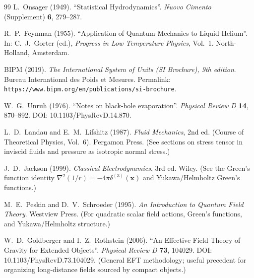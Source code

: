 \documentclass[pdflatex,sn-mathphys-num]{revtex4-2}
\begin{document}
\begin{thebibliography}{99}
        L.~Onsager (1949).
        ``Statistical Hydrodynamics''.
        \textit{Nuovo Cimento} (Supplement) \textbf{6}, 279--287.

        R.~P.~Feynman (1955).
        ``Application of Quantum Mechanics to Liquid Helium''.
        In: C.~J.~Gorter (ed.), \textit{Progress in Low Temperature Physics}, Vol.\ 1.
        North-Holland, Amsterdam.

        BIPM (2019).
        \textit{The International System of Units (SI Brochure), 9th edition}.
        Bureau International des Poids et Mesures.
        Permalink: \texttt{https://www.bipm.org/en/publications/si-brochure}.

        W.~G.~Unruh (1976).
        ``Notes on black-hole evaporation''.
        \textit{Physical Review D} \textbf{14}, 870--892.
        DOI: 10.1103/PhysRevD.14.870.

        L.~D.~Landau and E.~M.~Lifshitz (1987).
        \textit{Fluid Mechanics}, 2nd ed. (Course of Theoretical Physics, Vol.~6).
        Pergamon Press.
        (See sections on stress tensor in inviscid fluids and pressure as isotropic normal stress.)

        J.~D.~Jackson (1999).
        \textit{Classical Electrodynamics}, 3rd ed.
        Wiley.
        (See the Green's function identity \(\nabla^2(1/r)=-4\pi\delta^{(3)}(\mathbf{x})\) and Yukawa/Helmholtz Green's functions.)

        M.~E.~Peskin and D.~V.~Schroeder (1995).
        \textit{An Introduction to Quantum Field Theory}.
        Westview Press.
        (For quadratic scalar field actions, Green's functions, and Yukawa/Helmholtz structure.)

        W.~D.~Goldberger and I.~Z.~Rothstein (2006).
        ``An Effective Field Theory of Gravity for Extended Objects''.
        \textit{Physical Review D} \textbf{73}, 104029.
        DOI: 10.1103/PhysRevD.73.104029.
        (General EFT methodology; useful precedent for organizing long-distance fields sourced by compact objects.)

    \end{thebibliography}
\end{document}
